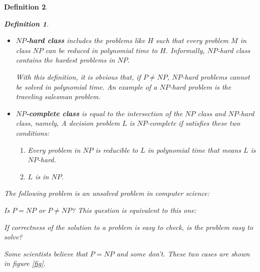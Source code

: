\documentclass[12pt]{article}
\theoremstyle{slplain}
\newtheorem{defi}{Definition}[section]
\begin{document}
\begin{defi}
\begin{defi}
\begin{itemize}
\item {\bf $NP$-hard class} includes the problems like $H$ such that every problem $M$ in class $NP$ can be reduced in polynomial time to $H$. Informally, $NP$-hard class contains the hardest problems in $NP$. 

With this definition, it is obvious that, if $P \not= NP$, $NP$-hard problems cannot be solved in polynomial time. An example of a $NP$-hard problem is the traveling salesman problem.\cite{lawler}

\item {\bf $NP$-complete class} is equal to the intersection of the $NP$ class and $NP$-hard class, namely, A decision problem $L$ is $NP$-complete if satisfies these two conditions:
\begin{enumerate}
\item Every problem in $NP$ is reducible to $L$ in polynomial time that means $L$ is $NP$-hard.

\item $L$ is in $NP$.
\end{enumerate}
\end{itemize}
\end{defi}


The following problem is an unsolved problem in computer science:

Is $P = NP$ or $P \not= NP$? This question is equivalent to this one: 

If correctness of the solution to a problem is easy to check, is the problem easy to solve? 

Some scientists believe that $P = NP$ and some don't. These two cases are shown in figure \ref{fig}.

\newcommand{\boundellipse}[3]%
{(#1) ellipse (#2 and #3)
}

\begin{figure}[!ht]
\centering


\end{figure}
\end{defi}
\end{document}

